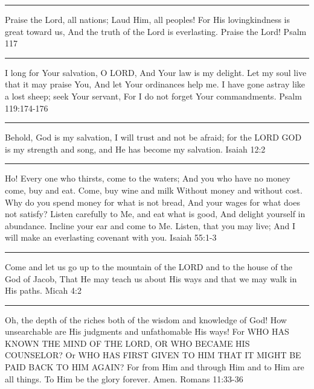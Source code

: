 \documentclass[]{book}
\begin{document}
\begin{center}\rule{0.5\linewidth}{\linethickness}\end{center}

Praise the Lord, all nations;
Laud Him, all peoples!
For His lovingkindness is great toward us,
And the truth of the Lord is everlasting.
Praise the Lord! \textbar{} Psalm 117

\begin{center}\rule{0.5\linewidth}{\linethickness}\end{center}

I long for Your salvation, O LORD, And Your law is my delight. Let my soul live that it may praise You, And let Your ordinances help me. I have gone astray like a lost sheep; seek Your servant, For I do not forget Your commandments. \textbar{} Psalm 119:174-176

\begin{center}\rule{0.5\linewidth}{\linethickness}\end{center}

Behold, God is my salvation, I will trust and not be afraid; for the LORD GOD is my strength and song, and He has become my salvation. \textbar{} Isaiah 12:2

\begin{center}\rule{0.5\linewidth}{\linethickness}\end{center}

Ho! Every one who thirsts, come to the waters; And you who have no money come, buy and eat. Come, buy wine and milk Without money and without cost. Why do you spend money for what is not bread, And your wages for what does not satisfy? Listen carefully to Me, and eat what is good, And delight yourself in abundance. Incline your ear and come to Me. Listen, that you may live; And I will make an everlasting covenant with you. \textbar{} Isaiah 55:1-3

\begin{center}\rule{0.5\linewidth}{\linethickness}\end{center}

Come and let us go up to the mountain of the LORD and to the house of the God of Jacob, That He may teach us about His ways and that we may walk in His paths. \textbar{} Micah 4:2

\begin{center}\rule{0.5\linewidth}{\linethickness}\end{center}

Oh, the depth of the riches both of the wisdom and knowledge of God! How unsearchable are His judgments and unfathomable His ways! For WHO HAS KNOWN THE MIND OF THE LORD, OR WHO BECAME HIS COUNSELOR? Or WHO HAS FIRST GIVEN TO HIM THAT IT MIGHT BE PAID BACK TO HIM AGAIN? For from Him and through Him and to Him are all things. To Him be the glory forever. Amen. \textbar{} Romans 11:33-36
\end{document}
